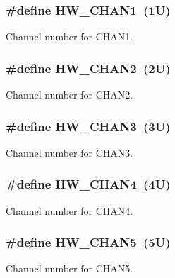 \subsubsection[{\texorpdfstring{H\+W\+\_\+\+C\+H\+A\+N1}{HW_CHAN1}}]{\setlength{\rightskip}{0pt plus 5cm}\#define H\+W\+\_\+\+C\+H\+A\+N1~(1\+U)}\hypertarget{group__ftm__hal_gad7bc026f98654ab8a0a869c54d6c09c9}{}\label{group__ftm__hal_gad7bc026f98654ab8a0a869c54d6c09c9}
Channel number for C\+H\+A\+N1. 
\subsubsection[{\texorpdfstring{H\+W\+\_\+\+C\+H\+A\+N2}{HW_CHAN2}}]{\setlength{\rightskip}{0pt plus 5cm}\#define H\+W\+\_\+\+C\+H\+A\+N2~(2\+U)}\hypertarget{group__ftm__hal_gab759c806b3708a402717876c439b5a51}{}\label{group__ftm__hal_gab759c806b3708a402717876c439b5a51}
Channel number for C\+H\+A\+N2. 
\subsubsection[{\texorpdfstring{H\+W\+\_\+\+C\+H\+A\+N3}{HW_CHAN3}}]{\setlength{\rightskip}{0pt plus 5cm}\#define H\+W\+\_\+\+C\+H\+A\+N3~(3\+U)}\hypertarget{group__ftm__hal_ga68ecd23bb7e7b8601d55f66422fa8e89}{}\label{group__ftm__hal_ga68ecd23bb7e7b8601d55f66422fa8e89}
Channel number for C\+H\+A\+N3. 
\subsubsection[{\texorpdfstring{H\+W\+\_\+\+C\+H\+A\+N4}{HW_CHAN4}}]{\setlength{\rightskip}{0pt plus 5cm}\#define H\+W\+\_\+\+C\+H\+A\+N4~(4\+U)}\hypertarget{group__ftm__hal_ga02e988fcd4bb2747633b9c23327aadc1}{}\label{group__ftm__hal_ga02e988fcd4bb2747633b9c23327aadc1}
Channel number for C\+H\+A\+N4. 
\subsubsection[{\texorpdfstring{H\+W\+\_\+\+C\+H\+A\+N5}{HW_CHAN5}}]{\setlength{\rightskip}{0pt plus 5cm}\#define H\+W\+\_\+\+C\+H\+A\+N5~(5\+U)}\hypertarget{group__ftm__hal_ga257bd9a10992b23e10d10058578f46a4}{}\label{group__ftm__hal_ga257bd9a10992b23e10d10058578f46a4}
Channel number for C\+H\+A\+N5. 
